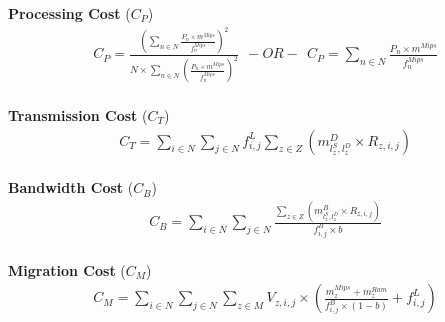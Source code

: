 \documentclass{article}
\begin{document}
\noindent\textbf{Processing Cost} ($C_P$)\\[6pt]
\begin{equation*}
\begin{aligned}
& C_P = \frac{\left(\sum_{n\in N} \frac{P_n \times m^{Mips}}{f_n^{Mips}}\right)^2}{N\times \sum_{n\in N} \left(\frac{P_n \times m^{Mips}}{f_n^{Mips}}\right)^2}~~ -OR- ~~ C_P = \sum_{n\in N} \frac{P_n \times m^{Mips}}{f_n^{Mips}}
\end{aligned}
\end{equation*}\\[6pt]

\noindent\textbf{Transmission Cost} ($C_T$)\\[6pt]
\begin{equation*}
\begin{split}
& C_T = \sum_{i\in N}\sum_{j\in N} f^L_{i,j}\sum_{z\in Z}\left( m^D_{l^S_z,l^D_z} \times R_{z, i,j} \right)
\end{split}
\end{equation*}\\[6pt]

\noindent\textbf{Bandwidth Cost} ($C_B$)\\[6pt]
\begin{equation*}
\begin{split}
& C_B = \sum_{i\in N}\sum_{j\in N} \frac{\sum_{z\in Z}\left( m^B_{l^S_z,l^D_z} \times R_{z, i,j} \right)}{f^B_{i,j} \times b}
\end{split}
\end{equation*}\\[6pt]

\noindent\textbf{Migration Cost} ($C_M$)\\[6pt]
\begin{equation*}
\begin{split}
& C_M = \sum_{i\in N}\sum_{j\in N} \sum_{z\in M} V_{z, i,j} \times \left(\frac{m^{Mips}_{z} + m^{Ram}_{z}}{f^B_{i,j}\times (1-b)} + f^L_{i,j} \right)
\end{split}
\end{equation*}\\[6pt]
\end{document}
